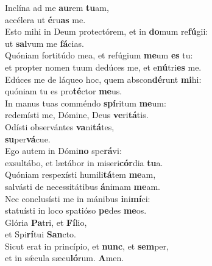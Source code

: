 \evenverse Inclína ad me \textbf{au}rem \textbf{tu}am,~\*\\
\evenverse accélera ut \textbf{é}ru\textbf{as} me.\\
\oddverse Esto mihi in Deum protectórem, et in \textbf{do}mum re\textbf{fú}gii:~\*\\
\oddverse ut \textbf{sal}vum me \textbf{fá}cias.\\
\evenverse Quóniam fortitúdo mea, et refúgium \textbf{me}um \textbf{es} tu:~\*\\
\evenverse et propter nomen tuum dedúces me, et e\textbf{nú}tri\textbf{es} me.\\
\oddverse Edúces me de láqueo hoc, quem abscon\textbf{dé}runt \textbf{mi}hi:~\*\\
\oddverse quóniam tu es pro\textbf{té}ctor \textbf{me}us.\\
\evenverse In manus tuas comméndo \textbf{spí}ritum \textbf{me}um:~\*\\
\evenverse redemísti me, Dómine, Deus \textbf{ve}ri\textbf{tá}tis.\\
\oddverse Odísti observántes \textbf{va}ni\textbf{tá}tes,~\*\\
\oddverse \textbf{su}per\textbf{vá}cue.\\
\evenverse Ego autem in Dómi\textbf{no} spe\textbf{rá}vi:~\*\\
\evenverse exsultábo, et lætábor in miseri\textbf{cór}dia \textbf{tu}a.\\
\oddverse Quóniam respexísti humili\textbf{tá}tem \textbf{me}am,~\*\\
\oddverse salvásti de necessitátibus \textbf{á}nimam \textbf{me}am.\\
\evenverse Nec conclusísti me in mánibus \textbf{i}ni\textbf{mí}ci:~\*\\
\evenverse statuísti in loco spatióso \textbf{pe}des \textbf{me}os.\\
\oddverse Glória \textbf{Pa}tri, et \textbf{Fí}lio,~\*\\
\oddverse et Spi\textbf{rí}tui \textbf{San}cto.\\
\evenverse Sicut erat in princípio, et \textbf{nunc}, et \textbf{sem}per,~\*\\
\evenverse et in sǽcula sæcu\textbf{ló}rum. \textbf{A}men.\\
